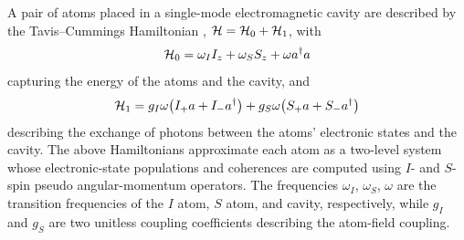 A pair of atoms placed in a single-mode electromagnetic cavity are described by the Tavis–Cummings Hamiltonian \cite{Tavis1968jun,Tavis1969dec}, ${\cal H} = {\cal H}_0 + {\cal H}_1$, with 
\begin{equation}
{\cal H}_0 = \omega_I I_z + \omega_S S_z + \omega a^{\dagger} a
\end{equation}
capturing the energy of the atoms and the cavity, and
\begin{equation}
{\cal H}_1 = g_I \omega \big( I_{+} a + I_{-} a^{\dagger} \big) + g_S \omega \big( S_{+} a + S_{-} a^{\dagger} \big)
\end{equation}
describing the exchange of photons between the atoms' electronic states and the cavity.
The above Hamiltonians approximate each atom as a two-level system whose electronic-state populations and coherences are computed using $I$- and $S$-spin pseudo angular-momentum operators. 
The frequencies $\omega_I$, $\omega_S$, $\omega$ are the transition frequencies of the $I$ atom, $S$ atom, and cavity, respectively, while $g_I$ and $g_S$ are two unitless coupling coefficients describing the atom-field coupling.

